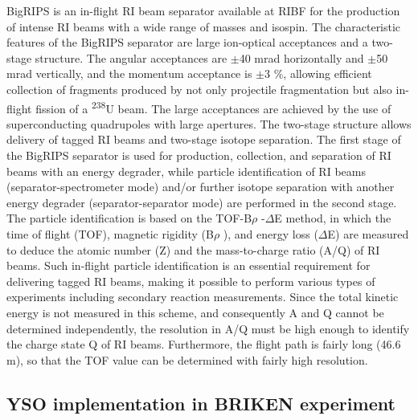 \documentclass[a4paper,12pt,twoside]{report}
\begin{document}
BigRIPS is an in-flight RI beam separator available at RIBF for the production of intense RI beams with a wide range of masses and isospin. The characteristic features of the BigRIPS separator are large ion-optical acceptances and a two-stage structure. The angular acceptances are $\pm$40 mrad horizontally and $\pm$50 mrad vertically, and the momentum acceptance is
$\pm$3 $\%$, allowing efficient collection of fragments produced by not only projectile fragmentation but also in-flight fission of a
\textsuperscript{238}U beam. The large acceptances are achieved by the use of superconducting quadrupoles with large apertures. The two-stage structure allows delivery of tagged RI beams and two-stage isotope separation. The first stage of the BigRIPS separator is used for production, collection, and separation of RI beams with an energy degrader, while particle identification of RI beams (separator-spectrometer mode) and/or further isotope separation with another energy degrader (separator-separator mode) are performed in the second stage. The particle identification is based on the TOF-B$\rho$ -$\Delta$E method, in which the time of flight (TOF), magnetic rigidity (B$\rho$ ), and energy loss ($\Delta$E) are measured to deduce the atomic number (Z) and the mass-to-charge ratio (A/Q) of RI beams. Such in-flight particle identification is an essential requirement for delivering tagged RI beams, making it possible to perform various types of experiments including secondary reaction measurements. Since the total kinetic energy is not measured in this scheme, and consequently A and Q cannot be determined independently, the resolution in A/Q must be high enough to identify the charge state Q of RI beams. Furthermore, the flight path is fairly long (46.6 m), so that the TOF value can be determined with fairly high resolution.



\subsection{YSO implementation in BRIKEN experiment}
\end{document}
